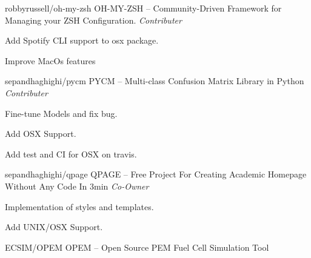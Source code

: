 


\begin{cventries}
  \cventry
    {robbyrussell/oh-my-zsh} %
    {OH-MY-ZSH -- Community-Driven Framework for Managing your ZSH Configuration.} %
    {\textit{Contributer}} %
    {} %
    {
      \begin{cvitems} %
        \item {Add Spotify CLI support to osx package.}
        \item {Improve MacOs features}
      \end{cvitems}
    }
        \newline
  \cventry
    {sepandhaghighi/pycm} %
    {PYCM -- Multi-class Confusion Matrix Library in Python} %
    {\textit{Contributer}} %
    {} %
    {
      \begin{cvitems} %
        \item {Fine-tune Models and fix bug.}
        \item {Add OSX Support.}
        \item {Add test and CI for OSX on travis.}
      \end{cvitems}
    }
        \newline
  \cventry
    {sepandhaghighi/qpage} %
    {QPAGE -- Free Project For Creating Academic Homepage Without Any Code In 3min} %
    {\textit{Co-Owner}} %
    {} %
    {
      \begin{cvitems} %
        \item {Implementation of styles and templates.}
        \item {Add UNIX/OSX Support.}
      \end{cvitems}
    }
        \newline
  \cventry
    {ECSIM/OPEM} %
    {OPEM -- Open Source PEM Fuel Cell Simulation Tool} %

\end{cventries}
